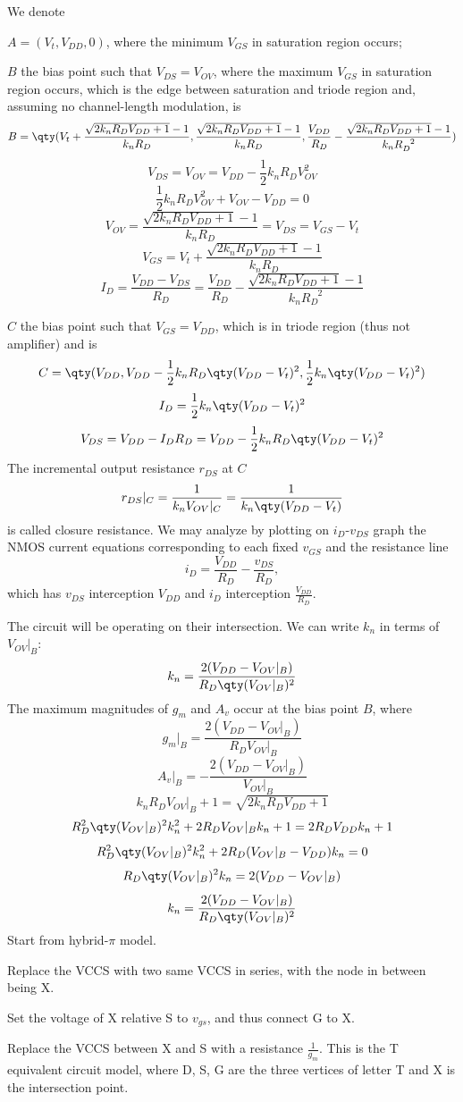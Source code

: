 \documentclass[a4paper,12pt]{report}
\begin{document}
We denote
\bit
\item $A=(V_t,V_{DD},0)$, where the minimum $V_{GS}$ in saturation region occurs;
\item $B$ the bias point such that $V_{DS}=V_{OV}$, where the maximum $V_{GS}$ in saturation region occurs, which is the edge between saturation and triode region and, assuming no channel-length modulation, is
\[B=\qty(V_t+\frac{\sqrt{2k_nR_DV_{DD}+1}-1}{k_nR_D},\frac{\sqrt{2k_nR_DV_{DD}+1}-1}{k_nR_D},\frac{V_{DD}}{R_D}-\frac{\sqrt{2k_nR_DV_{DD}+1}-1}{k_nR_D^{\phantom{D}2}})\]
\bpr
\[V_{DS}=V_{OV}=V_{DD}-\frac{1}{2}k_nR_DV_{OV}^2\]
\[\frac{1}{2}k_nR_DV_{OV}^2+V_{OV}-V_{DD}=0\]
\[V_{OV}=\frac{\sqrt{2k_nR_DV_{DD}+1}-1}{k_nR_D}=V_{DS}=V_{GS}-V_t\]
\[V_{GS}=V_t+\frac{\sqrt{2k_nR_DV_{DD}+1}-1}{k_nR_D}\]
\[I_D=\frac{V_{DD}-V_{DS}}{R_D}=\frac{V_{DD}}{R_D}-\frac{\sqrt{2k_nR_DV_{DD}+1}-1}{k_nR_D^{\phantom{D}2}}\]
\epr
\item $C$ the bias point such that $V_{GS}=V_{DD}$, which is in triode region (thus not amplifier) and is
\[C=\qty(V_{DD},V_{DD}-\frac{1}{2}k_nR_D\qty(V_{DD}-V_t)^2,\frac{1}{2}k_n\qty(V_{DD}-V_t)^2)\]
\bpr
\[I_D=\frac{1}{2}k_n\qty(V_{DD}-V_t)^2\]
\[V_{DS}=V_{DD}-I_DR_D=V_{DD}-\frac{1}{2}k_nR_D\qty(V_{DD}-V_t)^2\]
\epr
The incremental output resistance $r_{DS}$ at $C$
\[r_{DS}\vert_C=\frac{1}{k_nV_{OV}\vert_C}=\frac{1}{k_n\qty(V_{DD}-V_t)}\]
is called closure resistance.
\eit
{}
We may analyze by plotting on $i_D$-$v_{DS}$ graph the NMOS current equations corresponding to each fixed $v_{GS}$ and the resistance line
\[i_D=\frac{V_{DD}}{R_D}-\frac{v_{DS}}{R_D},\]
which has $v_{DS}$ interception $V_{DD}$ and $i_D$ interception $\frac{V_{DD}}{R_D}$.

The circuit will be operating on their intersection.
We can write $k_n$ in terms of $V_{OV}\vert_B$:
\[k_n=\frac{2(V_{DD}-V_{OV}\vert_B)}{R_D\qty(V_{OV}\vert_B)^2}\]
The maximum magnitudes of $g_m$ and $A_v$ occur at the bias point $B$, where
\[g_m\vert_B=\frac{2(V_{DD}-V_{OV}\vert_B)}{R_DV_{OV}\vert_B}\]
\[A_v\vert_B=-\frac{2(V_{DD}-V_{OV}\vert_B)}{V_{OV}\vert_B}\]
\bpr
\[k_nR_DV_{OV}\vert_B+1=\sqrt{2k_nR_DV_{DD}+1}\]
\[R_D^2\qty(V_{OV}\vert_B)^2k_n^2+2R_DV_{OV}\vert_Bk_n+1=2R_DV_{DD}k_n+1\]
\[R_D^2\qty(V_{OV}\vert_B)^2k_n^2+2R_D(V_{OV}\vert_B-V_{DD})k_n=0\]
\[R_D\qty(V_{OV}\vert_B)^2k_n=2(V_{DD}-V_{OV}\vert_B)\]
\[k_n=\frac{2(V_{DD}-V_{OV}\vert_B)}{R_D\qty(V_{OV}\vert_B)^2}\]
\epr
{}
Start from hybrid-$\pi$ model.
\ben
\item Replace the VCCS with two same VCCS in series, with the node in between being X.
\item Set the voltage of X relative S to $v_{gs}$, and thus connect G to X.
\item Replace the VCCS between X and S with a resistance $\frac{1}{g_m}$.
\een
This is the T equivalent circuit model, where D, S, G are the three vertices of letter T and X is the intersection point.
\end{document}
